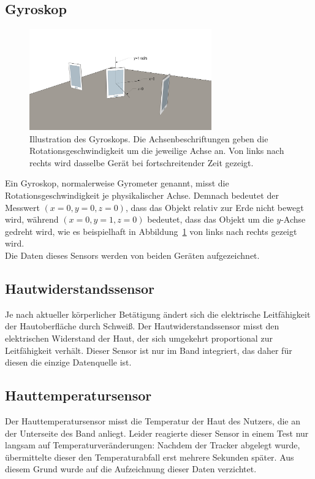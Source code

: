 \subsection{Gyroskop}
\begin{figure}
\centering
\includegraphics[clip=true,trim=0mm 0mm 0mm 0mm, width=0.7\textwidth]{img/gyroscope}
\caption[Illustration des Gyroskops]{Illustration des Gyroskops. Die Achsenbeschriftungen geben die Rotationsgeschwindigkeit um die jeweilige Achse an. Von links nach rechts wird dasselbe Gerät bei fortschreitender Zeit gezeigt.}
\label{fig:gyroscope}
\end{figure}
Ein Gyroskop, normalerweise Gyrometer genannt, misst die Rotationsgeschwindigkeit je physikalischer Achse\cite{SensorsOverview}. Demnach bedeutet der Messwert $(x=0, y=0, z=0)$, dass das Objekt relativ zur Erde nicht bewegt wird, während $(x=0, y=1, z=0)$ bedeutet, dass das Objekt um die $y$-Achse gedreht wird, wie es beispielhaft in Abbildung~\ref{fig:gyroscope} von links nach rechts gezeigt wird. \\
Die Daten dieses Sensors werden von beiden Geräten aufgezeichnet.

\subsection{Hautwiderstandssensor}
Je nach aktueller körperlicher Betätigung ändert sich die elektrische Leitfähigkeit der Hautoberfläche durch Schweiß. Der Hautwiderstandssensor misst den elektrischen Widerstand der Haut, der sich umgekehrt proportional zur Leitfähigkeit verhält.
Dieser Sensor ist nur im Band integriert, das daher für diesen die einzige Datenquelle ist.

\subsection{Hauttemperatursensor}
Der Hauttemperatursensor misst die Temperatur der Haut des Nutzers, die an der Unterseite des Band anliegt. Leider reagierte dieser Sensor in einem Test nur langsam auf Temperaturveränderungen: Nachdem der Tracker abgelegt wurde, übermittelte dieser den Temperaturabfall erst mehrere Sekunden später. Aus diesem Grund wurde auf die Aufzeichnung dieser Daten verzichtet.

